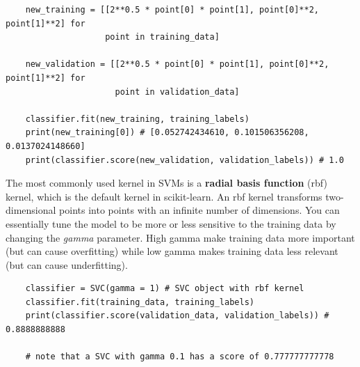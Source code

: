 \documentclass[11pt, a4paper]{article}
\begin{document}
\begin{spacing}{1.1}
\begin{lstlisting}
	new_training = [[2**0.5 * point[0] * point[1], point[0]**2, point[1]**2] for 
	                point in training_data]
	
	new_validation = [[2**0.5 * point[0] * point[1], point[0]**2, point[1]**2] for 
	                  point in validation_data]
	
	classifier.fit(new_training, training_labels)
	print(new_training[0]) # [0.052742434610, 0.101506356208, 0.0137024148660]
	print(classifier.score(new_validation, validation_labels)) # 1.0 \end{lstlisting} \vspace*{1mm}
	The most commonly used kernel in SVMs is a \textbf{radial basis function} (rbf) kernel, which is the default kernel in scikit-learn. An rbf kernel transforms two-dimensional points into points with an infinite number of dimensions. You can essentially tune the model to be more or less sensitive to the training data by changing the \textit{gamma} parameter. High gamma make training data more important (but can cause overfitting) while low gamma makes training data less relevant (but can cause underfitting). 
	\begin{lstlisting}
	classifier = SVC(gamma = 1) # SVC object with rbf kernel
	classifier.fit(training_data, training_labels)
	print(classifier.score(validation_data, validation_labels)) # 0.8888888888 
	
	# note that a SVC with gamma 0.1 has a score of 0.777777777778 \end{lstlisting} \newpage


\end{spacing}
\end{document}
